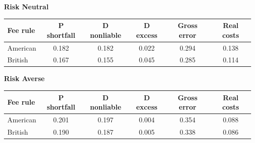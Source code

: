 \documentclass[10pt,border=5pt,varwidth=17cm]{standalone}
\begin{document}
\begingroup
\small
\setlength{\tabcolsep}{5pt}
\renewcommand{\arraystretch}{1.20}
\noindent\textbf{Risk Neutral}\par\smallskip
\noindent\begin{tabularx}{\linewidth}{@{}>{\raggedright\arraybackslash}Xccccc@{}}
\toprule
\textbf{Fee rule} & \textbf{P shortfall} & \textbf{D nonliable} & \textbf{D excess} & \textbf{Gross error} & \textbf{Real costs} \\
\midrule
American & 0.182 & 0.182 & 0.022 & 0.294 & 0.138 \\
British & 0.167 & 0.155 & 0.045 & 0.285 & 0.114 \\
\bottomrule\end{tabularx}\par\medskip
\noindent\textbf{Risk Averse}\par\smallskip
\noindent\begin{tabularx}{\linewidth}{@{}>{\raggedright\arraybackslash}Xccccc@{}}
\toprule
\textbf{Fee rule} & \textbf{P shortfall} & \textbf{D nonliable} & \textbf{D excess} & \textbf{Gross error} & \textbf{Real costs} \\
\midrule
American & 0.201 & 0.197 & 0.004 & 0.354 & 0.088 \\
British & 0.190 & 0.187 & 0.005 & 0.338 & 0.086 \\
\bottomrule\end{tabularx}\par\medskip
\endgroup
\end{document}

